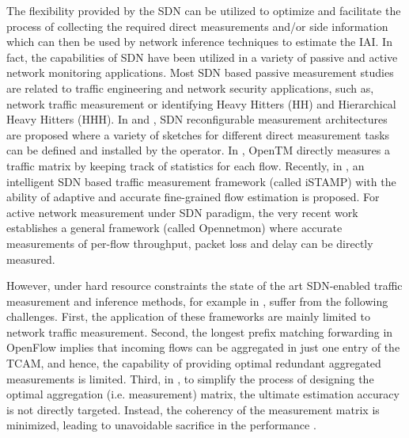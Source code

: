 The flexibility provided by the SDN can be utilized to optimize and facilitate the process of collecting the required direct measurements and/or side information which can then be used by network inference techniques to estimate the IAI. In fact, the capabilities of SDN have been utilized in a variety of passive and active network monitoring applications. Most SDN based passive measurement studies are related to traffic engineering and network security applications, such as, network traffic measurement or identifying Heavy Hitters (HH) and Hierarchical Heavy Hitters (HHH). In \cite{MYu:2011} and \cite{MYu:2013}, SDN reconfigurable measurement architectures are proposed where a variety of sketches for different direct measurement tasks can be defined and installed by the operator. In \cite{Tootoonchian:2010}, OpenTM directly measures a traffic matrix by keeping track of statistics for each flow. Recently, in \cite{IF14iSTAMP:2014}, an intelligent SDN based traffic measurement framework (called iSTAMP) with the ability of adaptive and accurate fine-grained flow estimation is proposed. For active network measurement under SDN paradigm, the very recent work \cite{Adrichen:2014} establishes a general framework (called Opennetmon) where accurate measurements of per-flow throughput, packet loss and delay can be directly measured.

However, under hard resource constraints the state of the art SDN-enabled traffic measurement and inference methods, for example in \cite{MYu:2013} \cite{IF14iSTAMP:2014}, suffer from the following challenges. First, the application of these frameworks are mainly limited to network traffic measurement. Second, the longest prefix matching forwarding in OpenFlow implies that incoming flows can be aggregated in just one entry of the TCAM, and hence, the capability of providing optimal redundant aggregated measurements is limited. Third, in \cite{IF14iSTAMP:2014}, to simplify the process of designing the optimal aggregation (i.e. measurement) matrix, the ultimate estimation accuracy is not directly targeted. Instead, the coherency of the measurement matrix is minimized, leading to unavoidable sacrifice in the performance \cite{IF14iSTAMP:2014}\cite{Elad:2007}.  

